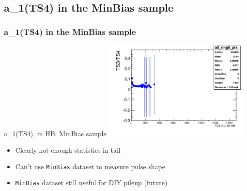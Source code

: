 \documentclass[bigger]{beamer}
\begin{document}
\subsection{a\_1(TS4) in the MinBias sample}
\label{sec-3-3}
\begin{frame}
\frametitle{a\_1(TS4) in the MinBias sample}
\label{sec-3-3-1}
\label{sec-3-3-1-1}

\centering
a\_1(TS4), in HB: MinBias sample
\includegraphics[width=0.55\textwidth]{fig/a0_ring0_MinBias.png}
\label{sec-3-3-1-2}
\begin{itemize}

\item Clearly not enough statistics in tail
\label{sec-3-3-1-2-1}%

\item Can't use \texttt{MinBias} dataset to measure pulse shape
\label{sec-3-3-1-2-2}%

\item \texttt{MinBias} dataset still useful for DIY pileup (future)
\label{sec-3-3-1-2-3}%
\end{itemize} %
\end{frame}
\end{document}
